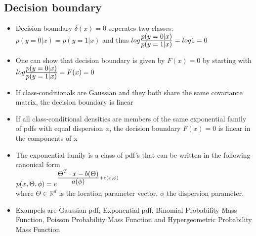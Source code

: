 \subsection*{Decision boundary}
\begin{itemize}
    \item
        Decision boundary $\delta(x) = 0$ seperates two classes: \\
        $p(y=0|x) = p(y=1|x)$ and thus $log \frac{\displaystyle p(y=0|x)}{\displaystyle p(y=1|x)} = log 1 = 0$
    \item
        One can show that decision boundary is given by $F(x) = 0$ by starting with\\
        $log \frac{\displaystyle p(y=0|x)}{\displaystyle p(y=1|x)} = F(x) = 0$
    \item
        If class-conditionals are Gaussian and they both share the same covariance matrix, the decision boundary is linear        
    \item
        If all class-conditional densities are members of the same exponential family of pdfs with equal dispersion $\phi$, the decision boundary $F(x) = 0$ is linear in the components of x
    \item
        The exponential family is a class of pdf's that can be written in the following canonical form\\
        $p(x, \Theta, \phi) = e^{\frac{\displaystyle \Theta^T \cdot x - b(\Theta)}{\displaystyle a(\phi)} + c(x, \phi)}$\\
        where $\Theta \in \mathbb{R}^d$ is the location parameter vector, $\phi$ the dispersion parameter.
    \item
        Exampels are Gaussian pdf, Exponential pdf, Binomial Probability Mass Function, Poisson Probability Mass Function and Hypergeometric Probability Mass Function
\end{itemize}
